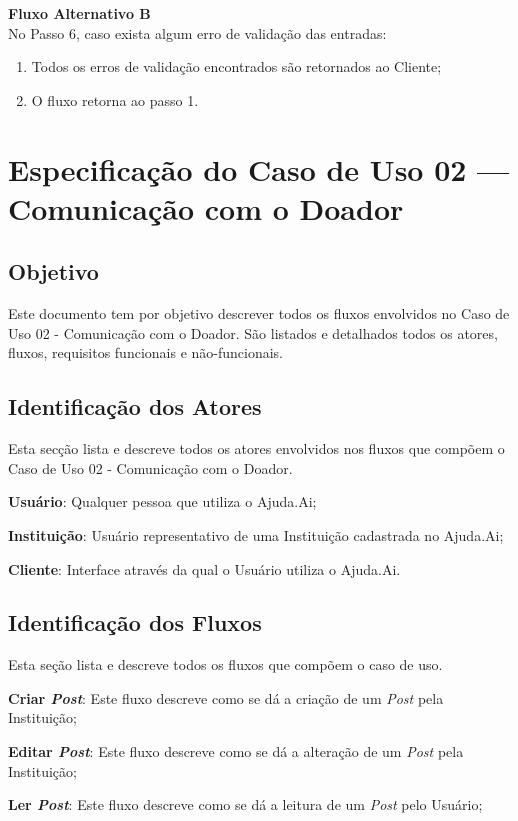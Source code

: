 \begin{anexosenv}
\begin{lista}
    \textbf{Fluxo Alternativo B} \\
    No Passo 6, caso exista algum erro de validação das entradas:
    \begin{enumerate}
    \item Todos os erros de validação encontrados são retornados ao Cliente;
    \item O fluxo retorna ao passo 1.
    \end{enumerate}
\end{lista}
\pagebreak

\section*{Especificação do Caso de Uso 02 --- Comunicação com o Doador}
\subsection*{Objetivo}
Este documento tem por objetivo descrever todos os fluxos envolvidos no Caso de Uso 02 - Comunicação com o Doador. São listados e detalhados todos os atores, fluxos, requisitos funcionais e não-funcionais.

\subsection*{Identificação dos Atores}
Esta secção lista e descreve todos os atores envolvidos nos fluxos que compõem o Caso de Uso 02 - Comunicação com o Doador.
\begin{lista}
  \item \textbf{Usuário}: Qualquer pessoa que utiliza o Ajuda.Ai;
  \item \textbf{Instituição}: Usuário representativo de uma Instituição cadastrada no Ajuda.Ai;
  \item \textbf{Cliente}: Interface através da qual o Usuário utiliza o Ajuda.Ai.
\end{lista}

\subsection*{Identificação dos Fluxos}
Esta seção lista e descreve todos os fluxos que compõem o caso de uso.
\begin{lista}
  \item \textbf{Criar \emph{Post}}: Este fluxo descreve como se dá a criação de um \emph{Post} pela Instituição;
  \item \textbf{Editar \emph{Post}}: Este fluxo descreve como se dá a alteração de um \emph{Post} pela Instituição;
  \item \textbf{Ler \emph{Post}}: Este fluxo descreve como se dá a leitura de um \emph{Post} pelo Usuário;
\end{lista}


\end{anexosenv}
